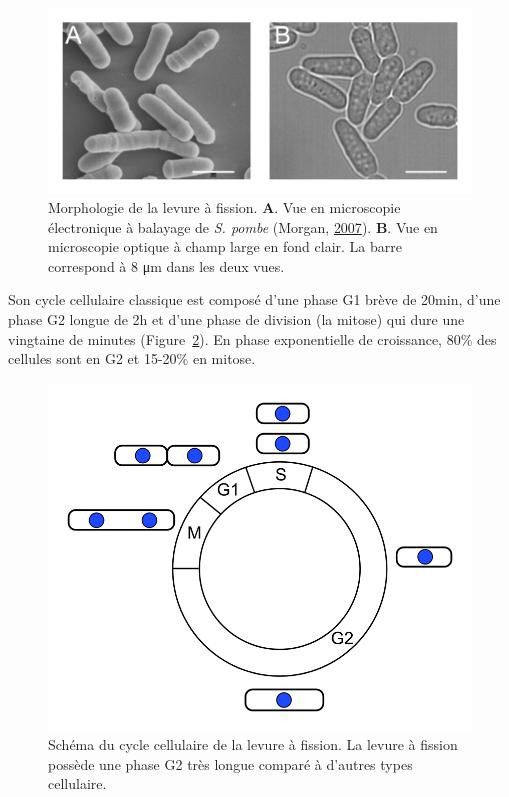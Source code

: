 \documentclass[12pt,a4paper,twoside,openright]{book}
\begin{document}
\begin{figure}[htbp]
\centering
\includegraphics{figures/intro/pombe.png}
\caption{\label{fig:pombe}Morphologie de la levure à fission.
\textbf{A}. Vue en microscopie électronique à balayage de \emph{S.
pombe} (Morgan, \protect\hyperlink{ref-Morgan2007}{2007}). \textbf{B}.
Vue en microscopie optique à champ large en fond clair. La barre
correspond à 8 μm dans les deux vues.}
\end{figure}

Son cycle cellulaire classique est composé d'une phase G1 brève de
20min, d'une phase G2 longue de 2h et d'une phase de division (la
mitose) qui dure une vingtaine de minutes
(Figure~\ref{fig:pombe-cell-cycle}). En phase exponentielle de
croissance, 80\% des cellules sont en G2 et 15-20\% en mitose.

\begin{figure}[htbp]
\centering
\includegraphics{figures/intro/pombe_cell_cycle.png}
\caption{\label{fig:pombe-cell-cycle}Schéma du cycle cellulaire de la
levure à fission. La levure à fission possède une phase G2 très longue
comparé à d'autres types cellulaire.}
\end{figure}
\end{document}
